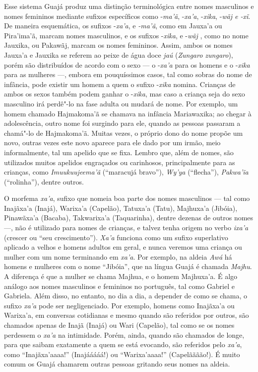 Esse sistema Guajá produz uma distinção terminológica entre nomes
masculinos e nomes femininos mediante sufixos específicos como
-\emph{ma'ã}, -\emph{xa'a}, -\emph{xika}, -\emph{wãj e -xĩ}. De maneira
esquemática, os sufixos -\emph{xa'a}, e \emph{-ma'ã}, como em Jauxa'a ou
Pira'ima'ã, marcam nomes masculinos, e os sufixos -\emph{xika}, e
-\emph{wãj} , como no nome Jauxika, ou Pakawãj, marcam os nomes
femininos. Assim, ambos os nomes Jauxa'a e Jauxika se referem ao peixe
de água doce \emph{jaú} (\emph{Zungaro zungaro}), porém são distribuídos
de acordo com o sexo --- o -\emph{xa'a} para os homens e o
-\emph{xika} para as mulheres ---, embora em pouquíssimos casos,
tal como sobras do nome de infância, pode existir um homem a quem o
sufixo -\emph{xika} nomina. Crianças de ambos os sexos também podem
ganhar o -\emph{xika}, mas caso a criança seja do sexo masculino irá
perdê"-lo na fase adulta ou mudará de nome. Por exemplo, um homem chamado
Hajmakoma'ã se chamava na infância Mariawaxika; ao chegar à
adolescência, outro nome foi surgindo para ele, quando as pessoas
passaram a chamá"-lo de Hajmakoma'ã. Muitas vezes, o próprio dono do nome
propõe um novo, outras vezes este novo aparece para ele dado por um
irmão, meio informalmente, tal um apelido que se fixa. Lembro que, além
de nomes, são utilizados muitos apelidos engraçados ou carinhosos,
principalmente para as crianças, como \emph{Imuukuujeema'ã} (``maracujá
bravo''), \emph{Wy'ya} (``flecha''), \emph{Pakwa'ĩa} (``rolinha''), dentre
outros.

O morfema \emph{xa'a}, sufixo que nomeia boa parte dos nomes masculinos
--- tal como Inajãxa'a (Inajá), Warixa'a (Capelão), Tatuxa'a (Tatu),
Majhuxa'a (Jibóia), Pinawãxa'a (Bacaba), Takwarixa'a (Taquarinha),
dentre dezenas de outros nomes ---, não é utilizado para nomes de
crianças, e talvez tenha origem no verbo \emph{ixa'a} (crescer ou ``seu
crescimento''). \emph{Xa'a} funciona como um sufixo superlativo aplicado
a velhos e homens adultos em geral, e nunca veremos uma criança ou
mulher com um nome terminando em \emph{xa'a}. Por exemplo, na aldeia
\emph{Awá} há homens e mulheres com o nome ``Jibóia'', que na língua
Guajá é chamada \emph{Majhu}. A diferença é que a mulher se chama
Majhua, e o homem Majhuxa'a. É algo análogo aos nomes masculinos e
femininos no português, tal como Gabriel e Gabriela. Além disso, no
entanto, no dia a dia, a depender de como se chama, o sufixo \emph{xa'a}
pode ser negligenciado. Por exemplo, homens como Inajãxa'a ou Warixa'a,
em conversas cotidianas e mesmo quando são referidos por outros, são
chamados apenas de Inajã (Inajá) ou Wari (Capelão), tal como se os nomes
perdessem o \emph{xa'a} na intimidade. Porém, ainda, quando são chamados
de longe, para que saibam exatamente a quem se está evocando, são
referidos pelo \emph{xa'a}, como ``Inajãxa'aaaa!'' (Inajááááá!) ou
``Warixa'aaaa!'' (Capelãããão!). É muito comum os Guajá chamarem outras
pessoas gritando seus nomes na aldeia.


